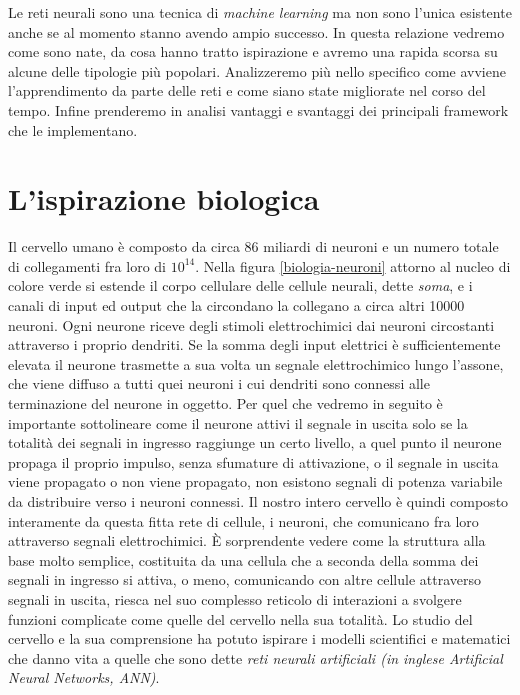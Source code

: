  Le reti neurali sono una tecnica di \emph{machine learning} ma non sono l'unica esistente anche se al momento stanno avendo ampio successo. In questa relazione vedremo come sono nate, da cosa hanno tratto ispirazione e avremo una rapida scorsa su alcune delle tipologie più popolari. Analizzeremo più nello specifico come avviene l'apprendimento da parte delle reti e come siano state migliorate nel corso del tempo. Infine prenderemo in analisi vantaggi e svantaggi dei principali framework che le implementano.

\section{L'ispirazione biologica}
Il cervello umano è composto da circa 86 miliardi di neuroni e un numero totale di collegamenti fra loro di $10^{14}$. Nella figura \ref{biologia-neuroni} attorno al nucleo di colore verde si estende il corpo cellulare delle cellule neurali, dette \textit{soma}, e i canali di input ed output che la circondano la collegano a circa altri 10000 neuroni.
Ogni neurone riceve degli stimoli elettrochimici dai neuroni circostanti attraverso i proprio dendriti. Se la somma degli input elettrici è sufficientemente elevata il neurone trasmette a sua volta un segnale elettrochimico lungo l'assone, che viene diffuso a tutti quei neuroni i cui dendriti sono connessi alle terminazione del neurone in oggetto.
Per quel che vedremo in seguito è importante sottolineare come il neurone attivi il segnale in uscita solo se la totalità dei segnali in ingresso raggiunge un certo livello, a quel punto il neurone propaga il proprio impulso, senza sfumature di attivazione, o il segnale in uscita viene propagato o non viene propagato, non esistono segnali di potenza variabile da distribuire verso i neuroni connessi.
Il nostro intero cervello è quindi composto interamente da questa fitta rete di cellule, i neuroni, che comunicano fra loro attraverso segnali elettrochimici. \`E sorprendente vedere come la struttura alla base molto semplice, costituita da una cellula che a seconda della somma dei segnali in ingresso si attiva, o meno, comunicando con altre cellule attraverso segnali in uscita, riesca nel suo complesso reticolo di interazioni a svolgere funzioni complicate come quelle del cervello nella sua totalità.
Lo studio del cervello e la sua comprensione ha potuto ispirare i modelli scientifici e matematici che danno vita a quelle che sono dette \textit{reti neurali artificiali (in inglese \textit{Artificial Neural Networks}, ANN)}.
\vspace{2 cm}

